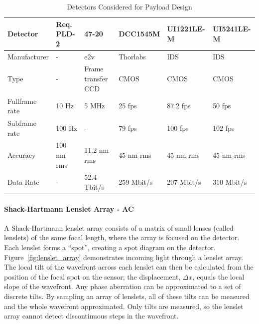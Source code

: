 \documentclass[12pt]{article}
\begin{document}
\begin{table}[!ht]
  \caption{Detectors Considered for Payload Design}
    \begin{tabular}{|l||l|llll|}
    \hline
    Detector                      & Req. PLD-2
    &47-20&DCC1545M&UI1221LE-M&UI5241LE-M\\ \hline \hline
    Manufacturer&-&e2v&Thorlabs&IDS&IDS\\ \hline
    Type&-&Frame transfer CCD&CMOS&CMOS&CMOS\\ \hline
    Fullframe rate&  10 Hz            & 5 MHz                       & 25 fps                 & 87.2 fps            & 50 fps              \\ \hline
    Subframe rate& 100 Hz            & -                           & 79 fps                 & 100 fps             & 102 fps             \\ \hline
    Accuracy       & 100 nm rms        & 11.2 nm rms                 & 45 nm rms              & 45 nm rms           & 45 nm rms           \\ \hline
    Data Rate& -                 & 52.4 Tbit/s               & 259 Mbit/s           & 207 Mbit/s        & 310 Mbit/s        \\\hline
    \end{tabular}\label{table:payload_detectors}
\end{table}


\paragraph{Shack-Hartmann Lenslet Array - AC} \label{sec:payload_sh}

A Shack-Hartmann lenslet array consists of a matrix of small lenses (called lenslets) of the same focal length, where the array is focused on the detector. Each lenslet forms a ``spot'', creating a spot diagram on the detector. Figure~\ref{fig:lenslet_array} demonstrates incoming light through a lenslet array. The local tilt of the wavefront across each lenslet can then be calculated from the position of the focal spot on the sensor; the displacement, $\Delta x$, equals the local slope of the wavefront. Any phase aberration can be approximated to a set of discrete tilts. By sampling an array of lenslets, all of these tilts can be measured and the whole wavefront approximated. Only tilts are measured, so the lenslet array cannot detect discontinuous steps in the wavefront.
\end{document}
